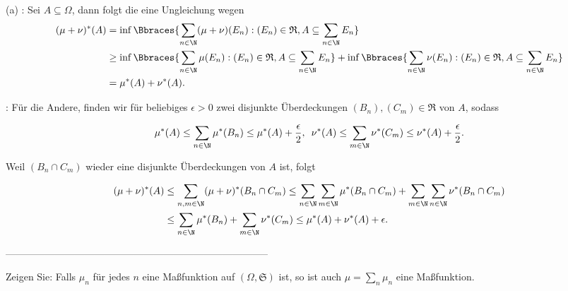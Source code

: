 \begin{solution}

(a) \Quote{$\geq$}: Sei $A \subseteq \Omega$, dann folgt die eine Ungleichung wegen \\

\begin{align*}
  (\mu + \nu)^\ast(A)
  & =
    \inf \Bbraces{\sum_{n \in \N} (\mu + \nu)(E_n): (E_n) \in \mathfrak{R}, A \subseteq \sum_{n \in \N} E_n} \\
  & \geq
    \inf \Bbraces{\sum_{n \in \N} \mu(E_n): (E_n) \in \mathfrak{R}, A \subseteq \sum_{n \in \N} E_n} +
    \inf \Bbraces{\sum_{n \in \N} \nu(E_n): (E_n) \in \mathfrak{R}, A \subseteq \sum_{n \in \N} E_n} \\
  & =
    \mu^\ast(A) + \nu^\ast(A).
\end{align*}

\Quote{$\leq$}: Für die Andere, finden wir für beliebiges $\epsilon > 0$ zwei disjunkte Überdeckungen $(B_n), (C_m) \in \mathfrak{R}$ von $A$, sodass

\begin{align*}
  \mu^\ast(A) \leq \sum_{n \in \N} \mu^\ast(B_n) \leq \mu^\ast(A) + \frac{\epsilon}{2}, \enspace
  \nu^\ast(A) \leq \sum_{m \in \N} \nu^\ast(C_m) \leq \nu^\ast(A) + \frac{\epsilon}{2}.
\end{align*}

Weil $(B_n \cap C_m)$ wieder eine disjunkte Überdeckungen von $A$ ist, folgt

\begin{align*}
  (\mu + \nu)^\ast(A)
  & \leq
    \sum_{n, m \in \N} (\mu + \nu)^\ast(B_n \cap C_m)
    \leq
    \sum_{n \in \N} \sum_{m \in \N} \mu^\ast(B_n \cap C_m) +
    \sum_{m \in \N} \sum_{n \in \N} \nu^\ast(B_n \cap C_m) \\
  & \leq
    \sum_{n \in \N} \mu^\ast(B_n) +
    \sum_{m \in \N} \nu^\ast(C_m)
    \leq
    \mu^\ast(A) + \nu^\ast(A) + \epsilon.
\end{align*}

\end{solution}

--------------------------------------------------------------------------------

\begin{exercise}

Zeigen Sie: Falls $\mu_n$ für jedes $n$ eine Maßfunktion auf $(\Omega, \mathfrak{S})$ ist, so ist auch $\mu = \sum_n \mu_n$ eine Maßfunktion.

\end{exercise}

